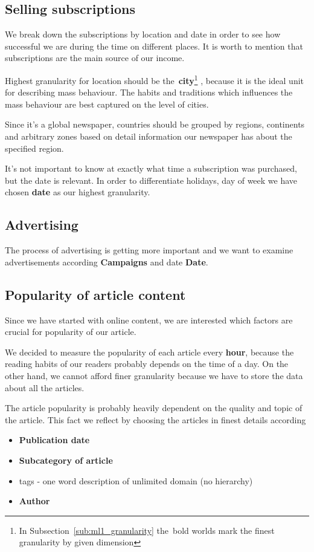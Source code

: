 
\subsection*{Selling subscriptions} 
We break down the subscriptions by location and date in order to see how successful we are during the time on different places. It is worth to mention that subscriptions are the main source of our income. 

Highest granularity for location should be 
the~{\bf city}\footnote{In Subsection~\ref{sub:ml1_granularity} the~bold worlds  mark the finest granularity by given dimension} 
, because it is the ideal unit for describing mass behaviour.  The habits and traditions  which influences the mass behaviour are best captured on the level of cities. 

Since it's a global newspaper, countries should be grouped by regions, continents and arbitrary zones based on detail information our newspaper has about the specified region.

It's not important to know at exactly what time a subscription was purchased, but the date is relevant. 
In order to differentiate holidays, day of week we have chosen {\bf date} as our highest granularity. 

\subsection*{Advertising} 
The process of advertising is getting more important
and we want to examine advertisements according {\bf Campaigns} and date {\bf Date}.  

\subsection*{Popularity of article content} 
Since we have started with online content, we are interested which factors are crucial for popularity of our article.

We decided to measure the popularity of each article every {\bf hour}, because the reading habits of our readers probably depends on the time of a day. On the other hand, we cannot afford finer granularity because we have to store the data about all the articles.

The article popularity is probably heavily dependent on the quality and topic of the article. 
This fact we reflect by choosing the articles in finest details
according
\begin{itemize}
    \item {\bf Publication date}
    \item {\bf Subcategory of article}
    \item tags - one word description of unlimited domain (no hierarchy)
    \item {\bf Author}
\end{itemize}



